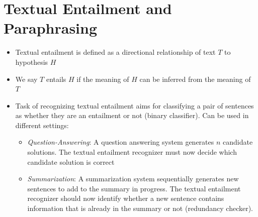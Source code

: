 \section{Textual Entailment and Paraphrasing}
\begin{itemize}
	\item Textual entailment is defined as a directional relationship of text $T$ to hypothesis $H$
	\item We say $T$ entails $H$ if the meaning of $H$ can be inferred from the meaning of $T$
	\item Task of recognizing textual entailment aims for classifying a pair of sentences as whether they are an entailment or not (binary classifier). Can be used in different settings:
	\begin{itemize}
		\item \textit{Question-Answering}: A question answering system generates $n$ candidate solutions. The textual entailment recognizer must now decide which candidate solution is correct
		\item \textit{Summarization}: A summarization system sequentially generates new sentences to add to the summary in progress. The textual entailment recognizer should now identify whether a new sentence contains information that is already in the summary or not (redundancy checker).
	\end{itemize}
\end{itemize}
